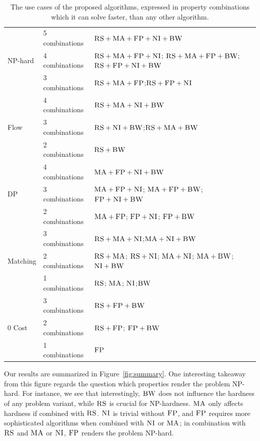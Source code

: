 \documentclass[9pt]{sigcomm-alternate}
\newcommand{\CC}{\textsc{NI}}
\newcommand{\FP}{\textsc{FP}}
\newcommand{\RS}{\textsc{RS}}
\newcommand{\BW}{\textsc{BW}}
\newcommand{\MA}{\textsc{MA}}
\begin{document}
\begin{table}
 

\begin{small}
\begin{tabular}{|l|l|p{4cm}|}
\hline
\multirow{3}{*}{NP-hard} & 5 combinations & \mbox{$\RS+\MA+\FP+\CC+\BW$}\\ 
\cline{2-3}
 & 4 combinations &  \mbox{$\RS+\MA+\FP+\CC$}; \mbox{$\RS+\MA+\FP+\BW$}; 
\mbox{$\RS+\FP+\CC+\BW$} \\ \cline{2-3}
 & 3 combinations &\mbox{$\RS+\MA+\FP$};\mbox{$\RS+\FP+\CC$} \\ 
 \hline
 \hline
\multirow{3}{*}{Flow} & 4 combinations & \mbox{$\RS+\MA+\CC+\BW$} \\ \cline{2-3}
 & 3 combinations & \mbox{$\RS+\CC+\BW$};\mbox{$\RS+\MA+\BW$}    \\ \cline{2-3}
 & 2 combinations &$\RS+\BW$ \\ 
 \hline
 \hline
\multirow{3}{*}{DP} & 4 combinations & \mbox{$\MA+\FP+\CC+\BW$} \\ \cline{2-3}
 & 3 combinations &   \mbox{$\MA+\FP+\CC$};  
\mbox{$\MA+\FP+\BW$}; \mbox{$\FP+\CC+\BW$} \\ \cline{2-3}
 & 2 combinations &\mbox{$\MA+\FP$}; \mbox{$\FP+\CC$};  
\mbox{$\FP+\BW$} \\ 
 \hline
 \hline
\multirow{3}{*}{Matching} &3 combinations& 
\mbox{$\RS+\MA+\CC$};\mbox{$\MA+\CC+\BW$}  \\ 
\cline{2-3}
 & 2 combinations & \mbox{$\RS+\MA$}; 
\mbox{$\RS+\CC$}; \mbox{$\MA+\CC$}; 
\mbox{$\MA+\BW$};\mbox{$\CC+\BW$} \\ \cline{2-3} 
& 1 combinations & \mbox{$\RS$}; \mbox{$\MA$}; 
\mbox{$\CC$};\mbox{$\BW$}\\
 \hline
 \hline
 \multirow{3}{*}{0 Cost} & 3 combinations & \mbox{$\RS+\FP+\BW$}\\ 
\cline{2-3}
 & 2 combinations & \mbox{$\RS+\FP$}; \mbox{$\FP+\BW$}  
\\ \cline{2-3}
 & 1 combinations & \mbox{$\FP$}\\ 
 \hline
\end{tabular}
\end{small}
\caption{The use cases of the proposed algorithms, expressed in property 
combinations which it can solve faster, than any other algorithm.}
\label{tab:summary}
\end{table}


Our results are summarized in
Figure~\ref{fig:summary}.
One interesting takeaway from this figure regards
the question which properties render the problem
NP-hard. For instance, we see that interestingly, $\BW$
does not influence the hardness of any problem variant,
while $\RS$ is crucial for NP-hardness.
$\MA$ only affects hardness if combined with $\RS$.
$\CC$ is trivial without $\FP$, and $\FP$ requires
more sophisticated algorithms when combined with $\CC$ or $\MA$;
in combination with $\RS$ and $\MA$ or $\CC$, $\FP$ renders the
problem NP-hard.
\end{document}
